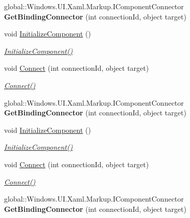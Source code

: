 \begin{DoxyCompactItemize}
global\+::\+Windows.\+U\+I.\+Xaml.\+Markup.\+I\+Component\+Connector {\bfseries Get\+Binding\+Connector} (int connection\+Id, object target)
\item 
void \hyperlink{class_i_v_s_calc_1_1_in_app_doc_aaea69e2cf03d01b3fcd38f048dbeb569}{Initialize\+Component} ()
\begin{DoxyCompactList}\small\item\em \hyperlink{class_i_v_s_calc_1_1_in_app_doc_aaea69e2cf03d01b3fcd38f048dbeb569}{Initialize\+Component()} \end{DoxyCompactList}\item 
void \hyperlink{class_i_v_s_calc_1_1_in_app_doc_a470427a176a8d7a0de6c0b82a9a45c4b}{Connect} (int connection\+Id, object target)
\begin{DoxyCompactList}\small\item\em \hyperlink{class_i_v_s_calc_1_1_in_app_doc_a470427a176a8d7a0de6c0b82a9a45c4b}{Connect()} \end{DoxyCompactList}\item 
\mbox{\label{class_i_v_s_calc_1_1_in_app_doc_a98bf2af895c0ebf86088946fabacd814}} 
global\+::\+Windows.\+U\+I.\+Xaml.\+Markup.\+I\+Component\+Connector {\bfseries Get\+Binding\+Connector} (int connection\+Id, object target)
\item 
void \hyperlink{class_i_v_s_calc_1_1_in_app_doc_aaea69e2cf03d01b3fcd38f048dbeb569}{Initialize\+Component} ()
\begin{DoxyCompactList}\small\item\em \hyperlink{class_i_v_s_calc_1_1_in_app_doc_aaea69e2cf03d01b3fcd38f048dbeb569}{Initialize\+Component()} \end{DoxyCompactList}\item 
void \hyperlink{class_i_v_s_calc_1_1_in_app_doc_a470427a176a8d7a0de6c0b82a9a45c4b}{Connect} (int connection\+Id, object target)
\begin{DoxyCompactList}\small\item\em \hyperlink{class_i_v_s_calc_1_1_in_app_doc_a470427a176a8d7a0de6c0b82a9a45c4b}{Connect()} \end{DoxyCompactList}\item 
\mbox{\label{class_i_v_s_calc_1_1_in_app_doc_a98bf2af895c0ebf86088946fabacd814}} 
global\+::\+Windows.\+U\+I.\+Xaml.\+Markup.\+I\+Component\+Connector {\bfseries Get\+Binding\+Connector} (int connection\+Id, object target)

\end{DoxyCompactItemize}
